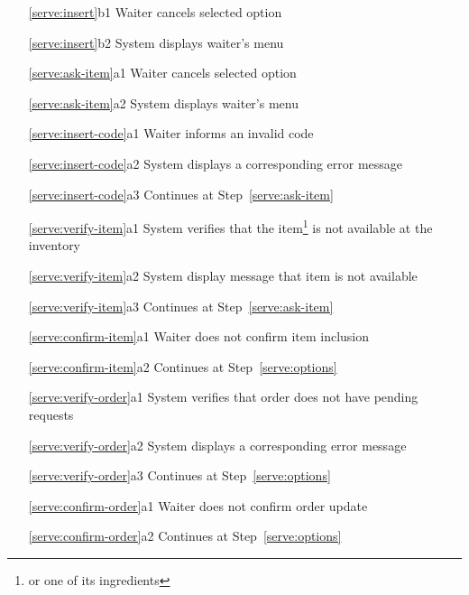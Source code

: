 \documentclass[a4paper,11pt,oneside]{book}
\newcommand{\cancel}[1]{#1 cancels selected option}
\newcommand{\menu}[1]{System displays #1's menu}
\newcommand{\goto}[1]{Continues at Step~\ref{#1}}
\begin{document}
\begin{enumerate}
  \item [\ref{serve:insert}b1] \cancel{Waiter}
  \item [\ref{serve:insert}b2] \menu{waiter}
    \\
  \item [\ref{serve:ask-item}a1] \cancel{Waiter}
  \item [\ref{serve:ask-item}a2] \menu{waiter}
    \\
  \item [\ref{serve:insert-code}a1] Waiter informs an invalid code
  \item [\ref{serve:insert-code}a2] System displays a corresponding error message
  \item [\ref{serve:insert-code}a3] \goto{serve:ask-item}
    \\
  \item [\ref{serve:verify-item}a1] System verifies that the item\footnote{or one of its ingredients} is not available at the inventory
  \item [\ref{serve:verify-item}a2] System display message that item is not available
  \item [\ref{serve:verify-item}a3] \goto{serve:ask-item}
    \\
  \item [\ref{serve:confirm-item}a1] Waiter does not confirm item inclusion
  \item [\ref{serve:confirm-item}a2] \goto{serve:options}
    \\
  \item [\ref{serve:verify-order}a1] System verifies that order does not have pending requests
  \item [\ref{serve:verify-order}a2] System displays a corresponding error message
  \item [\ref{serve:verify-order}a3] \goto{serve:options}
    \\
  \item [\ref{serve:confirm-order}a1] Waiter does not confirm order update
  \item [\ref{serve:confirm-order}a2] \goto{serve:options}
\end{enumerate}

\end{document}
